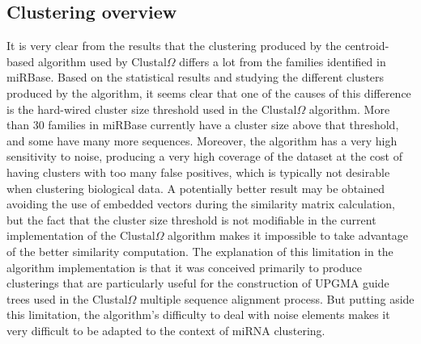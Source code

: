 \documentclass[nocrop]{bioinfo}
\begin{document}
\subsection{Clustering overview}
It is very clear from the results that the clustering produced by the centroid-based algorithm used by Clustal$\Omega$ differs a lot from the families identified in miRBase. Based on the statistical results and studying the different clusters produced by the algorithm, it seems clear that one of the causes of this difference is the hard-wired cluster size threshold used in the Clustal$\Omega$ algorithm. More than 30 families in miRBase currently have a cluster size above that threshold, and some have many more sequences. Moreover, the algorithm has a very high sensitivity to noise, producing a very high coverage of the dataset at the cost of having clusters with too many false positives, which is typically not desirable when clustering biological data. A potentially better result may be obtained avoiding the use of embedded vectors during the similarity matrix calculation, but the fact that the cluster size threshold is not modifiable in the current implementation of the Clustal$\Omega$ algorithm makes it impossible to take advantage of the better similarity computation. The explanation of this limitation in the algorithm implementation is that it was conceived primarily to produce clusterings that are particularly useful for the construction of UPGMA guide trees used in the Clustal$\Omega$ multiple sequence alignment process. But putting aside this limitation, the algorithm's difficulty to deal with noise elements makes it very difficult to be adapted to the context of miRNA clustering.
\end{document}
